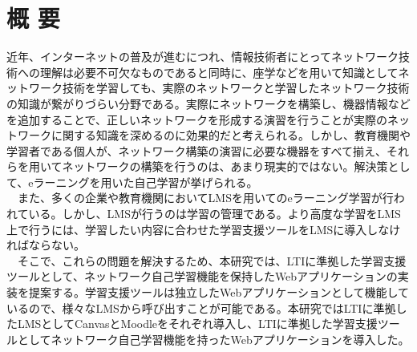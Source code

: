 \section*{\center 概 要}

近年、インターネットの普及が進むにつれ、情報技術者にとってネットワーク技術への理解は必要不可欠なものであると同時に、座学などを用いて知識としてネットワーク技術を学習しても、実際のネットワークと学習したネットワーク技術の知識が繋がりづらい分野である。実際にネットワークを構築し、機器情報などを追加することで、正しいネットワークを形成する演習を行うことが実際のネットワークに関する知識を深めるのに効果的だと考えられる。しかし、教育機関や学習者である個人が、ネットワーク構築の演習に必要な機器をすべて揃え、それらを用いてネットワークの構築を行うのは、あまり現実的ではない。解決策として、eラーニングを用いた自己学習が挙げられる。\\
　また、多くの企業や教育機関においてLMSを用いてのeラーニング学習が行われている。しかし、LMSが行うのは学習の管理である。より高度な学習をLMS上で行うには、学習したい内容に合わせた学習支援ツールをLMSに導入しなければならない。\\
　そこで、これらの問題を解決するため、本研究では、LTIに準拠した学習支援ツールとして、ネットワーク自己学習機能を保持したWebアプリケーションの実装を提案する。学習支援ツールは独立したWebアプリケーションとして機能しているので、様々なLMSから呼び出すことが可能である。本研究ではLTIに準拠したLMSとしてCanvasとMoodleをそれぞれ導入し、LTIに準拠した学習支援ツールとしてネットワーク自己学習機能を持ったWebアプリケーションを導入した。
